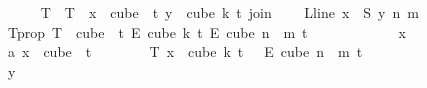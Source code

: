 \begin{isabellebody}
\ \ \ \ \isamarkupfalse%
\ T{\isacharprime}{\kern0pt}\ \ {\isachardoublequoteopen}T{\isacharprime}{\kern0pt}\ {\isasymequiv}\ {\isacharparenleft}{\kern0pt}{\isasymlambda}x\ {\isasymin}\ cube\ {}\ {\isacharparenleft}{\kern0pt}t{\isacharplus}{\kern0pt}{}{\isacharparenright}{\kern0pt}{\isachardot}{\kern0pt}\ {\isasymlambda}y\ {\isasymin}\ cube\ k\ {\isacharparenleft}{\kern0pt}t{\isacharplus}{\kern0pt}{}{\isacharparenright}{\kern0pt}{\isachardot}{\kern0pt}\ join\isanewline
\ \ \ \ {\isacharparenleft}{\kern0pt}L{\isacharunderscore}{\kern0pt}line\ {\isacharparenleft}{\kern0pt}x\ {}{\isacharparenright}{\kern0pt}{\isacharparenright}{\kern0pt}\ {\isacharparenleft}{\kern0pt}S\ y{\isacharparenright}{\kern0pt}\ n\ m{\isacharparenright}{\kern0pt}{\isachardoublequoteclose}\isanewline
\ \ \ \ \isamarkupfalse%
\ T{\isacharprime}{\kern0pt}{\isacharunderscore}{\kern0pt}prop{\isacharcolon}{\kern0pt}\ {\isachardoublequoteopen}T{\isacharprime}{\kern0pt}\ {\isasymin}\ cube\ {}\ {\isacharparenleft}{\kern0pt}t{\isacharplus}{\kern0pt}{}{\isacharparenright}{\kern0pt}\ {\isasymrightarrow}\isactrlsub E\ cube\ k\ {\isacharparenleft}{\kern0pt}t{\isacharplus}{\kern0pt}{}{\isacharparenright}{\kern0pt}\ {\isasymrightarrow}\isactrlsub E\ cube\ {\isacharparenleft}{\kern0pt}n\ {\isacharplus}{\kern0pt}\ m{\isacharparenright}{\kern0pt}\ {\isacharparenleft}{\kern0pt}t{\isacharplus}{\kern0pt}{}{\isacharparenright}{\kern0pt}{\isachardoublequoteclose}\isanewline
\ \ \ \ \isamarkupfalse%
\isanewline
\ \ \ \ \ \ \isamarkupfalse%
\ x\ \isamarkupfalse%
\ a{\isacharcolon}{\kern0pt}\ {\isachardoublequoteopen}x\ {\isasymin}\ cube\ {}\ {\isacharparenleft}{\kern0pt}t{\isacharplus}{\kern0pt}{}{\isacharparenright}{\kern0pt}{\isachardoublequoteclose}\isanewline
\ \ \ \ \ \ \isamarkupfalse%
\ {\isachardoublequoteopen}T{\isacharprime}{\kern0pt}\ x\ {\isasymin}\ cube\ k\ {\isacharparenleft}{\kern0pt}t\ {\isacharplus}{\kern0pt}\ {}{\isacharparenright}{\kern0pt}\ {\isasymrightarrow}\isactrlsub E\ cube\ {\isacharparenleft}{\kern0pt}n\ {\isacharplus}{\kern0pt}\ m{\isacharparenright}{\kern0pt}\ {\isacharparenleft}{\kern0pt}t\ {\isacharplus}{\kern0pt}\ {}{\isacharparenright}{\kern0pt}{\isachardoublequoteclose}\isanewline
\ \ \ \ \ \ \isamarkupfalse%
\isanewline
\ \ \ \ \ \ \ \ \isamarkupfalse%
\ y\ \isamarkupfalse%

\end{isabellebody}
